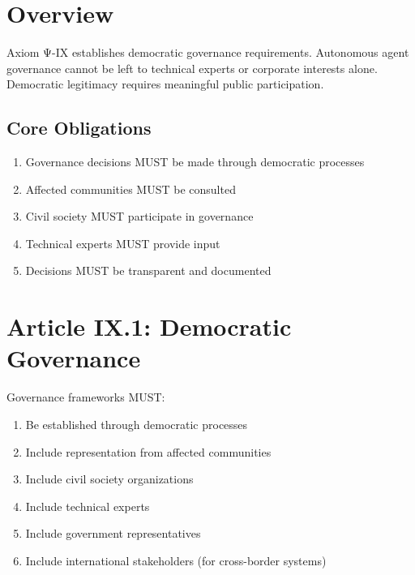 \vspace{0.5cm}

\section{Overview}

Axiom Ψ-IX establishes democratic governance requirements. Autonomous agent governance cannot be left to technical experts or corporate interests alone. Democratic legitimacy requires meaningful public participation.

\subsection{Core Obligations}

\begin{enumerate}
    \item Governance decisions MUST be made through democratic processes
    \item Affected communities MUST be consulted
    \item Civil society MUST participate in governance
    \item Technical experts MUST provide input
    \item Decisions MUST be transparent and documented
\end{enumerate}

\vspace{0.5cm}

\section{Article IX.1: Democratic Governance}

\begin{articlebox}
Governance frameworks MUST:
\begin{enumerate}
    \item Be established through democratic processes
    \item Include representation from affected communities
    \item Include civil society organizations
    \item Include technical experts
    \item Include government representatives
    \item Include international stakeholders (for cross-border systems)
\end{enumerate}
\end{articlebox}

